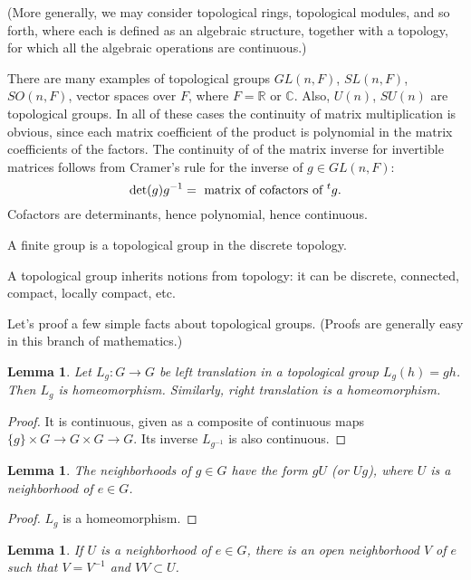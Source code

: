 \documentclass{amsart}
\newcommand{\ring}[1]{\mathbb{#1}}
\newtheorem{lemma}[equation]{Lemma}
\def\t#1{\hbox{}^t#1}
\begin{document}
(More generally, we may consider topological rings, topological
modules, and so forth, where each is defined as an algebraic
structure, together with a topology, for which all the algebraic
operations are continuous.)

There are many examples of topological groups $GL(n,F)$, $SL(n,F)$,
$SO(n,F)$, vector spaces over $F$, where $F=\ring{R}$ or $\ring{C}$.
Also, $U(n)$, $SU(n)$ are topological groups.  In all of these cases the
continuity of matrix multiplication is obvious, since each matrix
coefficient of the product is polynomial in the matrix coefficients of
the factors.  The continuity of of the matrix inverse for invertible
matrices follows from Cramer's rule \cite[Prop.~5.4]{knapp-basic} for
the inverse of $g\in GL(n,F)$:
\[
\det(g) g^{-1} = \text{  matrix of cofactors of } \t{g}.
\]
Cofactors are determinants, hence polynomial, hence continuous.

A finite group is a topological group in the discrete topology.

A topological group inherits notions from topology: it can be
discrete, connected, compact, locally compact, etc.

Let's proof a few simple facts about topological groups.  (Proofs are
generally easy in this branch of mathematics.)

\begin{lemma}
Let $L_g:G\to G$ be left translation in a topological group $L_g(h) = g h$.
Then $L_g$ is homeomorphism.  Similarly, right translation is a homeomorphism.
\end{lemma}

\begin{proof}
It is continuous, given as 
a composite of continuous maps $\{g\}\times G \to G\times G \to G$.
Its inverse $L_{g^{-1}}$ is also continuous.
\end{proof}

\begin{lemma}  The neighborhoods of $g\in G$ have the form $g U$ (or $Ug$),
where $U$ is a neighborhood of $e\in G$.
\end{lemma}

\begin{proof} $L_g$ is a homeomorphism.
\end{proof}

\begin{lemma} If $U$ is a neighborhood of $e\in G$, there is an open neighborhood  $V$ of $e$
such that $V= V^{-1}$ and $VV \subset U$.
\end{lemma}
\end{document}
